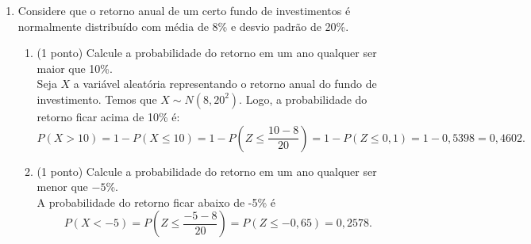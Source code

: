 \documentclass{article}
\begin{document}
\begin{enumerate}
\begin{enumerate}
	\item (1 ponto) Calcule a função de distribuição acumulada de $X$.\\{\color{blue}  
	Seja $t\geq 10$, então
	\begin{align*}
	F(t) = \int^{t}_{10} 200 x^{-3}dx = 200 \frac{x^{-2}}{(-2)} \Big|_{10}^{t} 
	= 100 \frac{1}{x^2} \Big|_{10}^{t}
	= 100 (\frac{1}{100} - \frac{1}{t^2})
	= 1 - \frac{100}{t^2}.
	\end{align*}
	Logo, a função de distribuição acumulada de $X$ é
	\begin{align*}
	F(t) = \left\{\begin{array}{ll}
	0, & t<10 \\
	1 - 100/t^2 , & t\geq 10.
	\end{array}\right.
	\end{align*}
	}
	
	\item (1 ponto) Calcule $P(X > 20)$.\\{\color{blue}  
	Pelo item anterior,
	\begin{align*}
	P(X>20) = 1 - P(X \leq 20) = 1 - (1 - 100/20^2) = 100/400 = 1/4.
	\end{align*}
	}
\end{enumerate}

\item Considere que o retorno anual de um certo fundo de investimentos é normalmente distribuído com média de 8\% e desvio padrão de 20\%.
\begin{enumerate}
  	\item (1 ponto) Calcule a probabilidade do retorno em um ano qualquer ser maior que 10\%.\\{\color{blue}  
	Seja $X$ a variável aleatória representando o retorno anual do fundo de investimento. Temos que $X\sim N(8, 20^2)$. Logo, a probabilidade do retorno ficar acima de 10\% é:
	$$
	P(X > 10) = 1 - P(X\leq 10) = 1 - P\left( Z \leq \frac{10-8}{20} \right)
	= 1 - P(Z \leq 0,1)
	= 1 - 0,5398
	= 0,4602.
	$$	
	}
	
   	\item (1 ponto) Calcule a probabilidade do retorno em um ano qualquer ser menor que $-5$\%.\\{\color{blue}  
	A probabilidade do retorno ficar abaixo de -5\% é
	$$
	P(X<-5) = P\left( Z \leq \frac{-5-8}{20} \right)
	= P(Z \leq -0,65)
	= 0,2578.
	$$	
	}
\end{enumerate} 


\end{enumerate}
\end{document}
